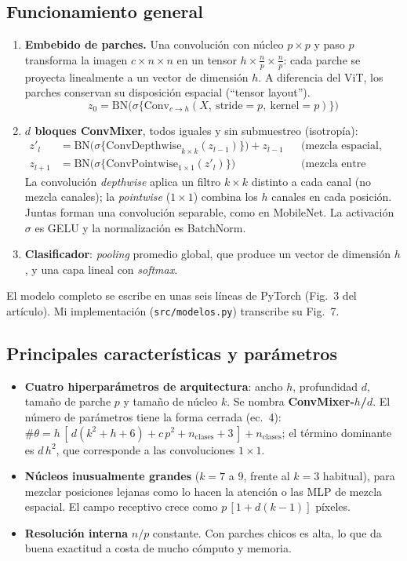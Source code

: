 \documentclass[11pt,a4paper]{article}
\begin{document}
\subsection{Funcionamiento general}
\begin{enumerate}
  \item \textbf{Embebido de parches.} Una convolución con núcleo $p\times p$ y paso $p$ transforma la imagen
  $c\times n\times n$ en un tensor $h\times\frac{n}{p}\times\frac{n}{p}$: cada parche se proyecta linealmente a un
  vector de dimensión $h$. A diferencia del ViT, los parches conservan su disposición espacial (``tensor layout'').
  \begin{equation}z_0=\mathrm{BN}\big(\sigma\{\mathrm{Conv}_{c\to h}(X,\ \text{stride}=p,\ \text{kernel}=p)\}\big)\end{equation}
  \item \textbf{$d$ bloques ConvMixer}, todos iguales y sin submuestreo (isotropía):
  \begin{align}
  z'_l&=\mathrm{BN}\big(\sigma\{\mathrm{ConvDepthwise}_{k\times k}(z_{l-1})\}\big)+z_{l-1} &&\text{(mezcla espacial, con residual)}\\
  z_{l+1}&=\mathrm{BN}\big(\sigma\{\mathrm{ConvPointwise}_{1\times1}(z'_l)\}\big) &&\text{(mezcla entre canales)}
  \end{align}
  La convolución \emph{depthwise} aplica un filtro $k\times k$ distinto a cada canal (no mezcla canales); la
  \emph{pointwise} ($1\times1$) combina los $h$ canales en cada posición. Juntas forman una convolución separable,
  como en MobileNet. La activación $\sigma$ es GELU y la normalización es BatchNorm.
  \item \textbf{Clasificador}: \emph{pooling} promedio global, que produce un vector de dimensión $h$, y una capa
  lineal con \emph{softmax}.
\end{enumerate}
El modelo completo se escribe en unas seis líneas de PyTorch (Fig.~3 del artículo). Mi implementación
(\texttt{src/modelos.py}) transcribe su Fig.~7.

\subsection{Principales características y parámetros}
\begin{itemize}
  \item \textbf{Cuatro hiperparámetros de arquitectura}: ancho $h$, profundidad $d$, tamaño de parche $p$ y tamaño
  de núcleo $k$. Se nombra \textbf{ConvMixer-$h$/$d$}. El número de parámetros tiene la forma cerrada (ec.~4):
  $\#\theta=h\,[\,d(k^2+h+6)+c\,p^2+n_{\text{clases}}+3\,]+n_{\text{clases}}$; el término dominante es $d\,h^2$, que
  corresponde a las convoluciones $1\times1$.
  \item \textbf{Núcleos inusualmente grandes} ($k=7$ a $9$, frente al $k=3$ habitual), para mezclar posiciones
  lejanas como lo hacen la atención o las MLP de mezcla espacial. El campo receptivo crece como $p\,[1+d(k-1)]$
  píxeles.
  \item \textbf{Resolución interna} $n/p$ constante. Con parches chicos es alta, lo que da buena exactitud a costa
  de mucho cómputo y memoria.
\end{itemize}
\end{document}

